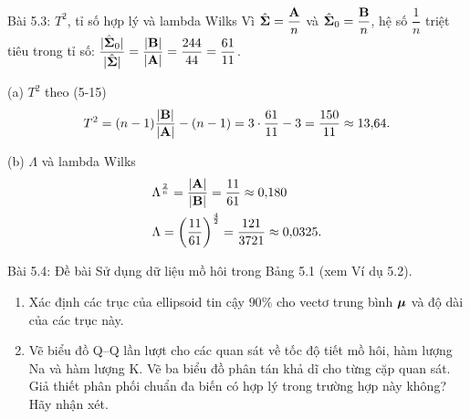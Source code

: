 \begin{frame}{Bài 5.3: \(T^2\), tỉ số hợp lý và lambda Wilks}
  Vì \(\hat{\boldsymbol{\Sigma}}=\dfrac{\mathbf{A}}{n}\) và \(\hat{\boldsymbol{\Sigma}}_0=\dfrac{\mathbf{B}}{n}\), hệ số \(\dfrac{1}{n}\) triệt tiêu trong tỉ số:
  \(\dfrac{|\hat{\boldsymbol{\Sigma}}_0|}{|\hat{\boldsymbol{\Sigma}}|}=\dfrac{|\mathbf{B}|}{|\mathbf{A}|}=\dfrac{244}{44}=\dfrac{61}{11}\).
 
    \begin{block}{(a) \(T^2\) theo (5-15)}
      \[
        T^2=(n-1)\frac{|\mathbf{B}|}{|\mathbf{A}|}-(n-1)
        =3\cdot\frac{61}{11}-3=\frac{150}{11}\approx13{,}64.
      \]
    \end{block}
    \vspace{-0.2cm}
    \begin{block}{(b) \(\Lambda\) và lambda Wilks}
      \[
      \begin{aligned}
        &\Lambda^{\frac{2}{n}}=\frac{|\mathbf{A}|}{|\mathbf{B}|}=\frac{11}{61}\approx0{,}180\\
        &\Lambda=\left(\frac{11}{61}\right)^{\frac{4}{2}}=\frac{121}{3721}\approx0{,}0325.
      \end{aligned}
      \]
    \end{block}
  \end{frame}


\begin{frame}{Bài 5.4: Đề bài}
  \vspace{1.7cm}
    Sử dụng dữ liệu mồ hôi trong Bảng 5.1 (xem Ví dụ 5.2).
    \begin{enumerate}
      \item[(a)] Xác định các trục của ellipsoid tin cậy \(90\%\) cho vectơ trung bình \(\boldsymbol{\mu}\) và độ dài của các trục này.
      \item[(b)] Vẽ biểu đồ Q--Q lần lượt cho các quan sát về tốc độ tiết mồ hôi, hàm lượng Na và hàm lượng K. Vẽ ba biểu đồ phân tán khả dĩ cho từng cặp quan sát. Giả thiết phân phối chuẩn đa biến có hợp lý trong trường hợp này không? Hãy nhận xét.
    \end{enumerate}
\end{frame}

